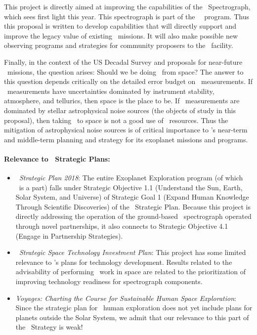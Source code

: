 \documentclass[12pt, letterpaper]{article}
\begin{document}
This project is directly aimed at improving the capabilities of the
\NEID\ Spectrograph, which sees first light this year. This
spectrograph is part of the \NASA\ \NNEXPLORE\ program. Thus this
proposal is written to develop capabilities that will directly support
and improve the legacy value of existing \NASA\ missions. It will also
make possible new observing programs and strategies for community
proposers to the \NNEXPLORE\ facility.

Finally, in the context of the US Decadal Survey and proposals for near-future
\NASA\ missions, the question arises: Should we be doing \EPRV\ from space?
The answer to this question depends critically on the detailed error budget on
\EPRV\ measurements. If \EPRV\ measurements have uncertainties dominated by
instrument stability, atmosphere, and tellurics, then space is the place to be.
If \EPRV\ measurements are dominated by stellar astrophysical noise sources (the
objects of study in this proposal), then taking \EPRV\ to space is not a good
use of \NASA\ resources. Thus the mitigation of astrophysical noise sources is
of critical importance to \NASA's near-term and middle-term planning and strategy
for its exoplanet missions and programs.

\paragraph{Relevance to \NASA\ Strategic Plans:}
\begin{itemize}
\item
\textit{\NASA\ Strategic Plan 2018}:
The entire Exoplanet Exploration program (of which \XRP\ is a part) falls under
Strategic Objective 1.1 (Understand the Sun, Earth, Solar System, and Universe)
of Strategic Goal 1 (Expand Human Knowledge Through Scientific Discoveries) of the
\NASA\ Strategic Plan. Because this project is directly
addressing the operation of the ground-based \NNEXPLORE\ spectrograph operated
through novel partnerships,
it also connects to Strategic Objective 4.1 (Engage in Partnership Strategies).
\item
\textit{\NASA\ Strategic Space Technology Investment Plan}:
This project has some limited relevance to \NASA's plans for technology development.
Results related to the advisability of performing \EPRV\ work in space are related to
the prioritization of improving technology readiness for spectrograph components.
\item
\textit{Voyages: Charting the Course for Sustainable Human Space Exploration}:
Since the strategic plan for \NASA\ human exploration does not yet include plans
for planets outside the Solar System, we admit that our relevance to this part
of the \NASA\ Strategy is weak!
\end{itemize}
\end{document}

